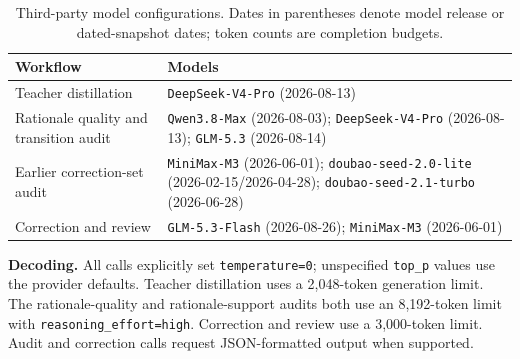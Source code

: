\begin{table}[H]
\centering

\begingroup
\fontsize{10pt}{11.5pt}\selectfont
\setlength{\tabcolsep}{3.5pt}
\renewcommand{\arraystretch}{1.0}

\begin{tabularx}{\columnwidth}{
  @{}
  >{\raggedright\arraybackslash}p{}
  >{\raggedright\arraybackslash}X
  @{}
}
\toprule
Workflow & Models \\
\midrule

Teacher distillation &
\texttt{DeepSeek-V4-Pro} (2026-08-13) \\

\midrule
Rationale quality and transition audit &
\texttt{Qwen3.8-Max} (2026-08-03);
\texttt{DeepSeek-V4-Pro} (2026-08-13);
\texttt{GLM-5.3} (2026-08-14) \\

\midrule
Earlier correction-set audit &
\texttt{MiniMax-M3} (2026-06-01);
\texttt{doubao-seed-2.0-lite} (2026-02-15/2026-04-28);
\texttt{doubao-seed-2.1-turbo} (2026-06-28) \\

\midrule
Correction and review &
\texttt{GLM-5.3-Flash} (2026-08-26);
\texttt{MiniMax-M3} (2026-06-01) \\

\bottomrule
\end{tabularx}
\endgroup

\par
\vspace{0.8\baselineskip}
\raggedright

\noindent\textbf{Decoding.}
All calls explicitly set \texttt{temperature=0}; unspecified
\texttt{top\_p} values use the provider defaults. Teacher distillation uses a
2,048-token generation limit. The rationale-quality and rationale-support
audits both use an 8,192-token limit with
\texttt{reasoning\_effort=high}. Correction and review use a 3,000-token
limit. Audit and correction calls request JSON-formatted output when supported.

\caption{Third-party model configurations. Dates in parentheses denote model
release or dated-snapshot dates; token counts are completion budgets.}
\label{tab:teacher-config}
\end{table}

